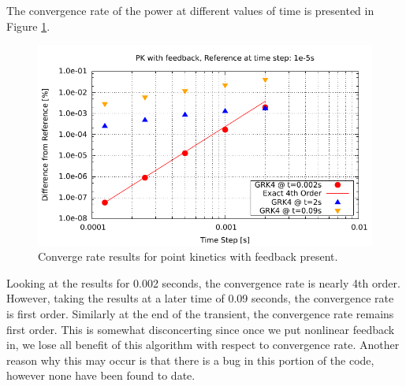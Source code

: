\documentclass{ansconf}
\numberwithin{equation}{section}
\begin{document}
The convergence rate of the power at different values of time is presented in Figure \ref{fig:pk_feedback_order}.
\begin{figure}
\centering \includegraphics[scale=1.00]{./figs/pk_feedback_order.pdf}
\caption{Converge rate results for point kinetics with feedback present.}
\label{fig:pk_feedback_order}
\end{figure}
Looking at the results for 0.002 seconds, the convergence rate is nearly 4th order. However, taking the results at a later time of 0.09 seconds, the convergence rate is first order. Similarly at the end of the transient, the convergence rate remains first order. This is somewhat disconcerting since once we put nonlinear feedback in, we lose all benefit of this algorithm with respect to convergence rate. Another reason why this may occur is that there is a bug in this portion of the code, however none have been found to date.

\label{sec:1D}
\end{document}
